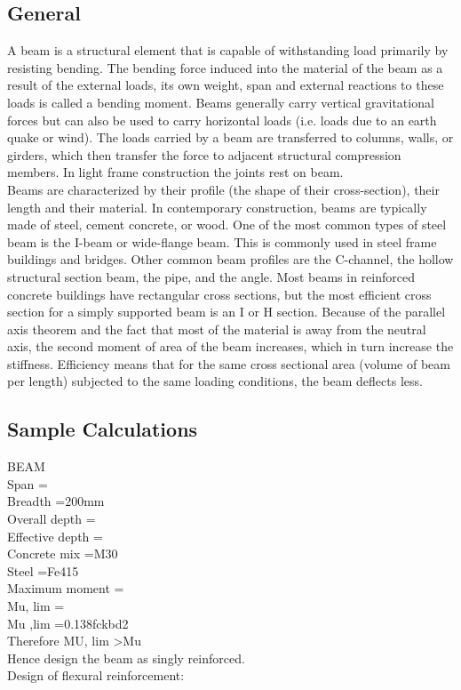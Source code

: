 \subsection{General}
 A beam is a structural element that is capable of withstanding load primarily by resisting bending. The bending force induced into the material of the beam as a result of the external loads, its own weight, span and external reactions to these loads is called a bending moment. Beams generally carry vertical gravitational forces but can also be used to carry horizontal loads (i.e. loads due to an earth quake or wind). The loads carried by a beam are transferred to columns, walls, or girders, which then transfer the force to adjacent structural compression members. In light frame construction the joints rest on beam. \\
Beams are characterized by their profile (the shape of their cross-section), their length and their material. In contemporary construction, beams are typically made of steel, cement concrete, or wood. One of the most common types of steel beam is the I-beam or wide-flange beam. This is commonly used in steel frame buildings and bridges. Other common beam profiles are the C-channel, the hollow structural section beam, the pipe, and the angle. Most  beams in reinforced concrete buildings have rectangular cross sections, but the most efficient cross section for a simply supported beam is an I or H section. Because of the parallel axis theorem and the fact that most of the material is away from the neutral axis, the second moment of area of the beam increases, which in turn increase the stiffness. Efficiency means that for the same cross sectional area (volume of beam per length) subjected to the same loading conditions, the beam deflects less.
\subsection{Sample Calculations}
BEAM \\
Span					       =\\
Breadth 	   =200mm\\
Overall depth                       =\\
Effective depth                              = \\
Concrete mix				         =M30 \\
Steel					         =Fe415	\\
Maximum moment                           = \\
Mu, lim				      =\\
Mu ,lim                                                      =0.138fckbd2\\
Therefore MU, lim >Mu\\
Hence design the beam as singly reinforced.\\
Design of flexural reinforcement:\\

